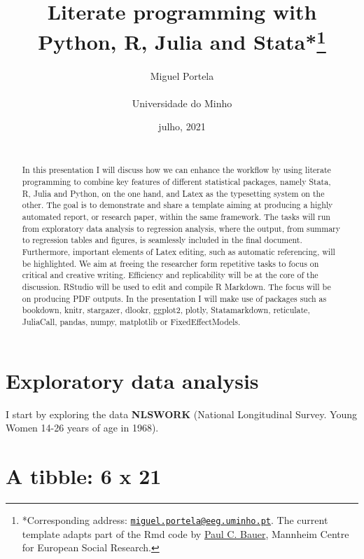 \documentclass[
  12pt,
]{article}
\title{\hfill\break
\hfill\break
\vspace{1cm}Literate programming with Python, R, Julia and Stata*\footnote{*Corresponding address: \href{mailto:miguel.portela@eeg.uminho.pt}{\nolinkurl{miguel.portela@eeg.uminho.pt}}. The current template adapts part of the Rmd code by \href{https://github.com/paulcbauer/Writing_a_reproducable_paper_in_rmarkdown}{Paul C. Bauer}, Mannheim Centre for European Social Research.}\vspace{0.5cm}\\}
\author{Miguel Portela\\
~\\
Universidade do Minho\\}
\date{\hfill\break
\hfill\break
1 julho, 2021\\
~\\}
\begin{document}
\maketitle
\begin{abstract}
\noindent{}In this presentation I will discuss how we can enhance the workflow by using literate programming to combine key features of different statistical packages, namely Stata, R, Julia and Python, on the one hand, and Latex as the typesetting system on the other. The goal is to demonstrate and share a template aiming at producing a highly automated report, or research paper, within the same framework. The tasks will run from exploratory data analysis to regression analysis, where the output, from summary to regression tables and figures, is seamlessly included in the final document. Furthermore, important elements of Latex editing, such as automatic referencing, will be highlighted. We aim at freeing the researcher form repetitive tasks to focus on critical and creative writing. Efficiency and replicability will be at the core of the discussion. RStudio will be used to edit and compile R Markdown. The focus will be on producing PDF outputs. In the presentation I will make use of packages such as bookdown, knitr, stargazer, dlookr, ggplot2, plotly, Statamarkdown, reticulate, JuliaCall, pandas, numpy, matplotlib or FixedEffectModels.\vspace{.8cm}
\end{abstract}

\clearpage

\renewcommand{\baselinestretch}{0.5}\normalsize

\renewcommand{\baselinestretch}{1.1}\normalsize

\clearpage

\hypertarget{exploratory-data-analysis}{%
\section{Exploratory data analysis}\label{exploratory-data-analysis}}

I start by exploring the data \textbf{NLSWORK} (National Longitudinal Survey. Young Women 14-26 years of age in 1968).

\hypertarget{a-tibble-6-x-21}{%
\section{A tibble: 6 x 21}\label{a-tibble-6-x-21}}
\end{document}
